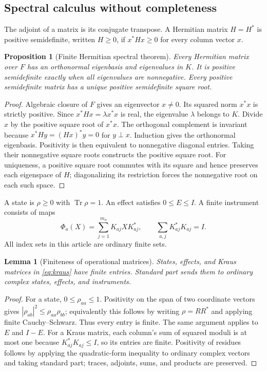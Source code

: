 \documentclass[11pt,oneside]{article}
\numberwithin{equation}{section}
\theoremstyle{plain}
\newtheorem{proposition}[theorem]{Proposition}
\newtheorem{lemma}[theorem]{Lemma}
\theoremstyle{definition}
\theoremstyle{remark}
\newcommand{\Tr}{\operatorname{Tr}}
\newcommand{\abs}[1]{\left|#1\right|}
\begin{document}
\subsection{Spectral calculus without completeness}
The adjoint of a matrix is its conjugate transpose. A Hermitian matrix $H=H^*$ is positive semidefinite, written $H\ge0$, if $x^*Hx\ge0$ for every column vector $x$.

\begin{proposition}[Finite Hermitian spectral theorem]\label{prop:spectral}
Every Hermitian matrix over $F$ has an orthonormal eigenbasis and eigenvalues in $K$. It is positive semidefinite exactly when all eigenvalues are nonnegative. Every positive semidefinite matrix has a unique positive semidefinite square root.
\end{proposition}
\begin{proof}
Algebraic closure of $F$ gives an eigenvector $x\ne0$. Its squared norm $x^*x$ is strictly positive. Since $x^*Hx=\lambda x^*x$ is real, the eigenvalue $\lambda$ belongs to $K$. Divide $x$ by the positive square root of $x^*x$. The orthogonal complement is invariant because $x^*Hy=(Hx)^*y=0$ for $y\perp x$. Induction gives the orthonormal eigenbasis. Positivity is then equivalent to nonnegative diagonal entries. Taking their nonnegative square roots constructs the positive square root. For uniqueness, a positive square root commutes with its square and hence preserves each eigenspace of $H$; diagonalizing its restriction forces the nonnegative root on each such space.
\end{proof}

A state is $\rho\ge0$ with $\Tr\rho=1$. An effect satisfies $0\le E\le I$. A finite instrument consists of maps
\begin{equation}\label{eq:kraus}
 \Phi_a(X)=\sum_{j=1}^{m_a}K_{aj}XK_{aj}^*,
 \qquad \sum_{a,j}K_{aj}^*K_{aj}=I.
\end{equation}
All index sets in this article are ordinary finite sets.

\begin{lemma}[Finiteness of operational matrices]\label{lem:finitequantum}
States, effects, and Kraus matrices in \eqref{eq:kraus} have finite entries. Standard part sends them to ordinary complex states, effects, and instruments.
\end{lemma}
\begin{proof}
For a state, $0\le\rho_{aa}\le1$. Positivity on the span of two coordinate vectors gives $\abs{\rho_{ab}}^2\le\rho_{aa}\rho_{bb}$; equivalently this follows by writing $\rho=RR^*$ and applying finite Cauchy--Schwarz. Thus every entry is finite. The same argument applies to $E$ and $I-E$. For a Kraus matrix, each column's sum of squared moduli is at most one because $K_{aj}^*K_{aj}\le I$, so its entries are finite. Positivity of residues follows by applying the quadratic-form inequality to ordinary complex vectors and taking standard part; traces, adjoints, sums, and products are preserved.
\end{proof}
\end{document}
